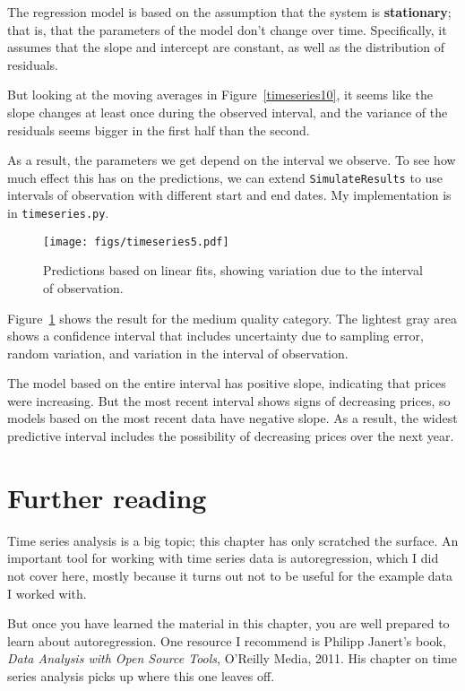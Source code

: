 \documentclass[12pt]{book}
\begin{document}
The regression model is based on the assumption that the system
is {\bf stationary}; that is, that the parameters of the model
don't change over time.
Specifically, it assumes that the slope and
intercept are constant, as well as the distribution of residuals.

But looking at the moving averages in Figure~\ref{timeseries10}, it
seems like the slope changes at least once during the observed
interval, and the variance of the residuals seems bigger in the first
half than the second.

As a result, the parameters we get depend on the interval we
observe.  To see how much effect this has on the predictions,
we can extend {\tt SimulateResults} to use intervals of observation
with different start and end dates.  My implementation is in
{\tt timeseries.py}.

\begin{figure}
\centerline{\texttt{[image: figs/timeseries5.pdf]}}
\caption{Predictions based on linear fits, showing
variation due to the interval of observation.}
\label{timeseries5}
\end{figure}

Figure~\ref{timeseries5} shows the result for the medium quality
category.  The lightest gray area shows a confidence interval that
includes uncertainty due to sampling error, random variation, and
variation in the interval of observation.

The model based on the entire interval has positive slope, indicating
that prices were increasing.  But the most recent interval shows signs
of decreasing prices, so models based on the most recent data have
negative slope.  As a result, the widest predictive interval includes
the possibility of decreasing prices over the next year.


\section{Further reading}

Time series analysis is a big topic; this chapter has only scratched
the surface.  An important tool for working with time series data
is autoregression, which I did not cover here, mostly because it turns
out not to be useful for the example data I worked with.

But once you
have learned the material in this chapter, you are well prepared
to learn about autoregression.  One resource I recommend is
Philipp Janert's book, {\it Data Analysis with Open Source Tools},
O'Reilly Media, 2011.  His chapter on time series analysis picks up
where this one leaves off.
\end{document}
